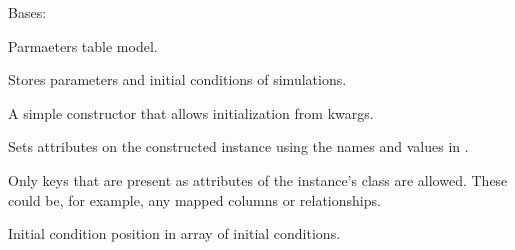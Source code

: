 \documentclass[a4paper,landscape,10pt,english]{sphinxmanual}
\begin{document}
\begin{fulllineitems}
\label{\detokenize{code_docs/simulation_api.model:simulation_api.model.models.ParameterDB}}
Bases: 

Parmaeters table model.

Stores parameters and initial conditions of simulations.

\begin{fulllineitems}
\label{\detokenize{code_docs/simulation_api.model:simulation_api.model.models.ParameterDB.__init__}}
A simple constructor that allows initialization from kwargs.

Sets attributes on the constructed instance using the names and
values in .

Only keys that are present as
attributes of the instance’s class are allowed. These could be,
for example, any mapped columns or relationships.

\end{fulllineitems}


\begin{fulllineitems}
\label{\detokenize{code_docs/simulation_api.model:simulation_api.model.models.ParameterDB.ini_cndtn_id}}
Initial condition position in array of initial conditions.

\end{fulllineitems}


\begin{fulllineitems}
\label{\detokenize{code_docs/simulation_api.model:simulation_api.model.models.ParameterDB.param_id}}
\end{fulllineitems}


\end{fulllineitems}
\end{document}
